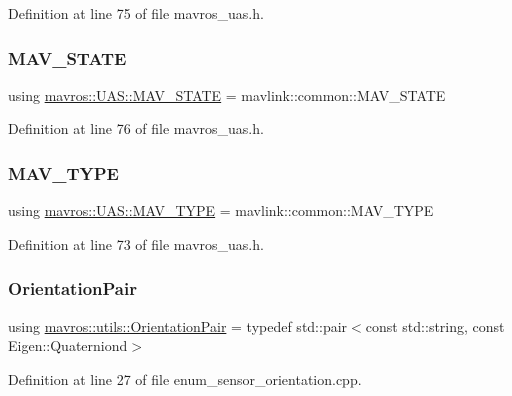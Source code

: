 Definition at line 75 of file mavros\+\_\+uas.\+h.

\mbox{\label{group__nodelib_ga85bd5a7930c4de36d657e1f8b890e19f}} 
\subsubsection{\texorpdfstring{MAV\_STATE}{MAV\_STATE}}
{\footnotesize\ttfamily using \mbox{\hyperlink{group__nodelib_ga85bd5a7930c4de36d657e1f8b890e19f}{mavros\+::\+U\+A\+S\+::\+M\+A\+V\+\_\+\+S\+T\+A\+TE}} =  mavlink\+::common\+::\+M\+A\+V\+\_\+\+S\+T\+A\+TE}



Definition at line 76 of file mavros\+\_\+uas.\+h.

\mbox{\label{group__nodelib_ga96b408110c3646b92bef49d32ed1c84b}} 
\subsubsection{\texorpdfstring{MAV\_TYPE}{MAV\_TYPE}}
{\footnotesize\ttfamily using \mbox{\hyperlink{group__nodelib_ga96b408110c3646b92bef49d32ed1c84b}{mavros\+::\+U\+A\+S\+::\+M\+A\+V\+\_\+\+T\+Y\+PE}} =  mavlink\+::common\+::\+M\+A\+V\+\_\+\+T\+Y\+PE}



Definition at line 73 of file mavros\+\_\+uas.\+h.

\mbox{\label{group__nodelib_ga5f662b76cd833191017cb702a0d49986}} 
\subsubsection{\texorpdfstring{OrientationPair}{OrientationPair}}
{\footnotesize\ttfamily using \mbox{\hyperlink{group__nodelib_ga5f662b76cd833191017cb702a0d49986}{mavros\+::utils\+::\+Orientation\+Pair}} = typedef std\+::pair$<$const std\+::string, const Eigen\+::\+Quaterniond$>$}



Definition at line 27 of file enum\+\_\+sensor\+\_\+orientation.\+cpp.

